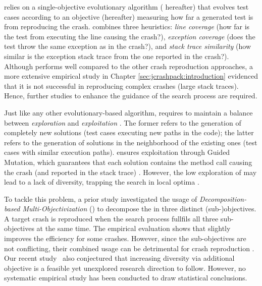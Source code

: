 \evocrash relies on a single-objective evolutionary algorithm (\textit{\SGGA} hereafter) that evolves test cases according to an objective (\CrashFunction hereafter) measuring how far a generated test is from reproducing the crash. \CrashFunction combines three heuristics: \textit{line coverage} (how far is the test from executing the line causing the crash?), \textit{exception coverage} (does the test throw the same exception as in the crash?), and \textit{stack trace similarity} (how similar is the exception stack trace from the one reported in the crash?). %
%
Although \SGGA performs well compared to the other crash reproduction approaches, a more extensive empirical study in Chapter \ref{sec:jcrashpack:introduction} evidenced that it is not successful in reproducing complex crashes (\ie large stack traces). Hence, further studies to enhance the guidance of the search process are required.

Just like any other evolutionary-based algorithm, \SGGA requires to maintain a balance between \textit{exploration} and \textit{exploitation} \cite{vcrepinvsek2013}. The former refers to the generation of completely new solutions (\ie test cases executing new paths in the code); the latter refers to the generation of solutions in the neighborhood of the existing ones (\ie test cases with similar execution paths). \SGGA ensures exploitation through Guided Mutation, which guarantees that each solution contains the method call causing the crash (and reported in the stack trace) \cite{Soltani2018a}. However, the low exploration of \SGGA may lead to a lack of diversity, trapping the search in local optima \cite{vcrepinvsek2013}.

To tackle this problem, a prior study \cite{Soltani2018b} investigated the usage of \textit{De\-com\-po\-si\-tion-based Multi-Objectivization} (\decomposition) to decompose the \CrashFunction in three distinct (sub-)objectives. A target crash is reproduced when the search process fullfils all three sub-objectives at the same time. The empirical evaluation shows that \decomposition slightly improves the efficiency for some crashes. However, since the sub-objectives are not conflicting, their combined usage can be detrimental for crash reproduction \cite{Soltani2018b}. Our recent study~\cite{Derakhshanfar2020a} also conjectured that increasing diversity via additional objective is a feasible yet unexplored  research direction to follow. However, no systematic empirical study has been conducted to draw statistical conclusions.

